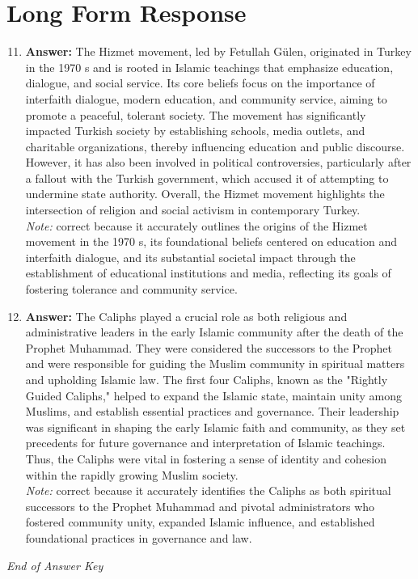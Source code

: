 \documentclass[12pt]{article}
\begin{document}
\section*{Long Form Response}
\begin{enumerate}[label=\arabic*.]
\setcounter{enumi}{10}
\item \textbf{Answer:} The Hizmet movement, led by Fetullah Gülen, originated in Turkey in the 1970 s and is rooted in Islamic teachings that emphasize education, dialogue, and social service. Its core beliefs focus on the importance of interfaith dialogue, modern education, and community service, aiming to promote a peaceful, tolerant society. The movement has significantly impacted Turkish society by establishing schools, media outlets, and charitable organizations, thereby influencing education and public discourse. However, it has also been involved in political controversies, particularly after a fallout with the Turkish government, which accused it of attempting to undermine state authority. Overall, the Hizmet movement highlights the intersection of religion and social activism in contemporary Turkey.
\\ \textit{Note:} correct because it accurately outlines the origins of the Hizmet movement in the 1970 s, its foundational beliefs centered on education and interfaith dialogue, and its substantial societal impact through the establishment of educational institutions and media, reflecting its goals of fostering tolerance and community service.
\item \textbf{Answer:} The Caliphs played a crucial role as both religious and administrative leaders in the early Islamic community after the death of the Prophet Muhammad. They were considered the successors to the Prophet and were responsible for guiding the Muslim community in spiritual matters and upholding Islamic law. The first four Caliphs, known as the "Rightly Guided Caliphs," helped to expand the Islamic state, maintain unity among Muslims, and establish essential practices and governance. Their leadership was significant in shaping the early Islamic faith and community, as they set precedents for future governance and interpretation of Islamic teachings. Thus, the Caliphs were vital in fostering a sense of identity and cohesion within the rapidly growing Muslim society.
\\ \textit{Note:} correct because it accurately identifies the Caliphs as both spiritual successors to the Prophet Muhammad and pivotal administrators who fostered community unity, expanded Islamic influence, and established foundational practices in governance and law.
\end{enumerate}

\vfill
\noindent\textit{End of Answer Key}
\end{document}
